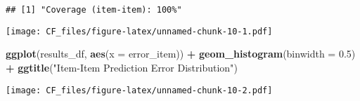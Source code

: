 \documentclass[
]{article}
\newenvironment{Shaded}{\begin{snugshade}}{\end{snugshade}}
\newcommand{\AttributeTok}[1]{\textcolor[rgb]{0.13,0.29,0.53}{#1}}
\newcommand{\FloatTok}[1]{\textcolor[rgb]{0.00,0.00,0.81}{#1}}
\newcommand{\FunctionTok}[1]{\textcolor[rgb]{0.13,0.29,0.53}{\textbf{#1}}}
\newcommand{\NormalTok}[1]{#1}
\newcommand{\OtherTok}[1]{\textcolor[rgb]{0.56,0.35,0.01}{#1}}
\newcommand{\SpecialCharTok}[1]{\textcolor[rgb]{0.81,0.36,0.00}{\textbf{#1}}}
\newcommand{\StringTok}[1]{\textcolor[rgb]{0.31,0.60,0.02}{#1}}
\begin{document}
\begin{verbatim}
## [1] "Coverage (item-item): 100%"
\end{verbatim}

\begin{Shaded}
\end{Shaded}

\texttt{[image: CF\_files/figure-latex/unnamed-chunk-10-1.pdf]}

\begin{Shaded}
\begin{Highlighting}[]
\FunctionTok{ggplot}\NormalTok{(results\_df, }\FunctionTok{aes}\NormalTok{(}\AttributeTok{x =}\NormalTok{ error\_item)) }\SpecialCharTok{+} 
  \FunctionTok{geom\_histogram}\NormalTok{(}\AttributeTok{binwidth =} \FloatTok{0.5}\NormalTok{) }\SpecialCharTok{+} 
  \FunctionTok{ggtitle}\NormalTok{(}\StringTok{"Item{-}Item Prediction Error Distribution"}\NormalTok{)}
\end{Highlighting}
\end{Shaded}

\texttt{[image: CF\_files/figure-latex/unnamed-chunk-10-2.pdf]}
\end{document}
